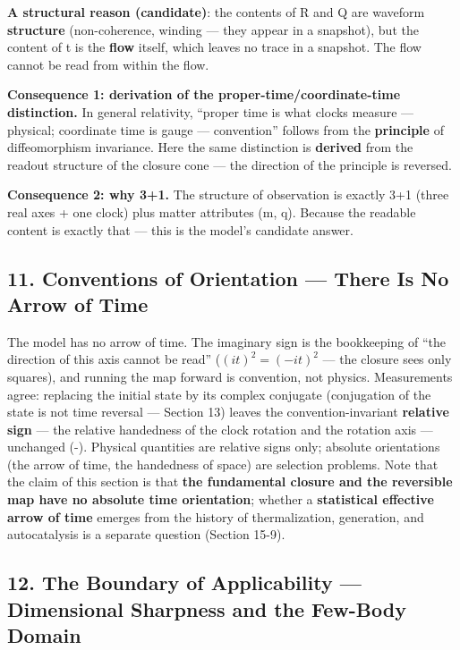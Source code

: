 \documentclass[
  a4paper,
]{article}
\begin{document}
\textbf{A structural reason (candidate)}: the contents of R and Q are
waveform \textbf{structure} (non-coherence, winding --- they appear in a
snapshot), but the content of t is the \textbf{flow} itself, which
leaves no trace in a snapshot. The flow cannot be read from within the
flow.

\textbf{Consequence 1: derivation of the proper-time/coordinate-time
distinction.} In general relativity, ``proper time is what clocks
measure --- physical; coordinate time is gauge --- convention'' follows
from the \textbf{principle} of diffeomorphism invariance. Here the same
distinction is \textbf{derived} from the readout structure of the
closure cone --- the direction of the principle is reversed.

\textbf{Consequence 2: why 3+1.} The structure of observation is exactly
3+1 (three real axes + one clock) plus matter attributes (m, q). Because
the readable content is exactly that --- this is the model's candidate
answer.

\subsection{11. Conventions of Orientation --- There Is No Arrow of
Time}\label{conventions-of-orientation-there-is-no-arrow-of-time}

The model has no arrow of time. The imaginary sign is the bookkeeping of
``the direction of this axis cannot be read'' (\((it)^2=(-it)^2\) ---
the closure sees only squares), and running the map forward is
convention, not physics. Measurements agree: replacing the initial state
by its complex conjugate (conjugation of the state is not time reversal
--- Section 13) leaves the convention-invariant \textbf{relative sign}
--- the relative handedness of the clock rotation and the rotation axis
--- unchanged (-). Physical quantities are relative signs only; absolute
orientations (the arrow of time, the handedness of space) are selection
problems. Note that the claim of this section is that \textbf{the
fundamental closure and the reversible map have no absolute time
orientation}; whether a \textbf{statistical effective arrow of time}
emerges from the history of thermalization, generation, and
autocatalysis is a separate question (Section 15-9).

\subsection{12. The Boundary of Applicability --- Dimensional Sharpness
and the Few-Body
Domain}\label{the-boundary-of-applicability-dimensional-sharpness-and-the-few-body-domain}
\end{document}
